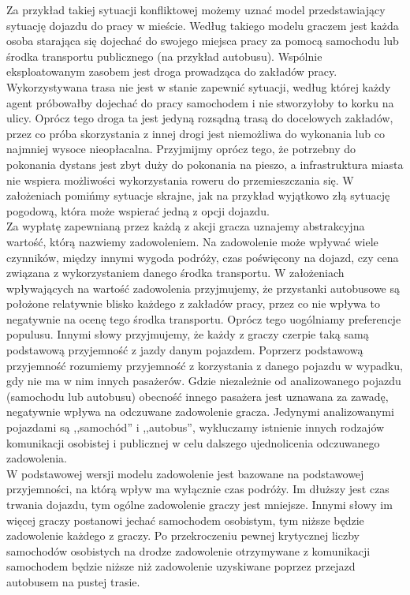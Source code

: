 \documentclass[12pt,a4paper]{article}
\begin{document}
Za przykład takiej sytuacji konfliktowej możemy uznać model przedstawiający sytuację dojazdu do pracy w mieście. Według takiego modelu graczem jest każda osoba starająca się dojechać do swojego miejsca pracy za pomocą samochodu lub środka transportu publicznego (na przykład autobusu). Wspólnie eksploatowanym zasobem jest droga prowadząca do zakładów pracy. Wykorzystywana trasa nie jest w stanie zapewnić sytuacji, według której każdy agent próbowałby dojechać do pracy samochodem i nie stworzyłoby to korku na ulicy. Oprócz tego droga ta jest jedyną rozsądną trasą do docelowych zakładów, przez co próba skorzystania z innej drogi jest niemożliwa do wykonania lub co najmniej wysoce nieopłacalna. Przyjmijmy oprócz tego, że potrzebny do pokonania dystans jest zbyt duży do pokonania na pieszo, a infrastruktura miasta nie wspiera możliwości wykorzystania roweru do przemieszczania się. W założeniach pomińmy sytuacje skrajne, jak na przykład wyjątkowo złą sytuację pogodową, która może wspierać jedną z opcji dojazdu.\\
Za wypłatę zapewnianą przez każdą z akcji gracza uznajemy abstrakcyjna wartość, którą nazwiemy zadowoleniem. Na zadowolenie może wpływać wiele czynników, między innymi wygoda podróży, czas poświęcony na dojazd, czy cena związana z wykorzystaniem danego środka transportu. W założeniach wpływających na wartość zadowolenia przyjmujemy, że przystanki autobusowe są położone relatywnie blisko każdego z zakładów pracy, przez co nie wpływa to negatywnie na ocenę tego środka transportu. Oprócz tego uogólniamy preferencje populusu. Innymi słowy przyjmujemy, że każdy z graczy czerpie taką samą podstawową przyjemność z jazdy danym pojazdem. Poprzerz podstawową przyjemność rozumiemy przyjemność z korzystania z danego pojazdu w wypadku, gdy nie ma w nim innych pasażerów. Gdzie niezależnie od analizowanego pojazdu (samochodu lub autobusu) obecność innego pasażera jest uznawana za zawadę, negatywnie wpływa na odczuwane zadowolenie gracza. Jedynymi analizowanymi pojazdami są ,,samochód'' i ,,autobus'', wykluczamy istnienie innych rodzajów komunikacji osobistej i publicznej w celu dalszego ujednolicenia odczuwanego zadowolenia.\\

W podstawowej wersji modelu zadowolenie jest bazowane na podstawowej przyjemności, na którą wpływ ma wyłącznie czas podróży. Im dłuższy jest czas trwania dojazdu, tym ogólne zadowolenie graczy jest mniejsze. Innymi słowy im więcej graczy postanowi jechać samochodem osobistym, tym niższe będzie zadowolenie każdego z graczy. Po przekroczeniu pewnej krytycznej liczby samochodów osobistych na drodze zadowolenie otrzymywane z komunikacji samochodem będzie niższe niż zadowolenie uzyskiwane poprzez przejazd autobusem na pustej trasie. 
\end{document}
